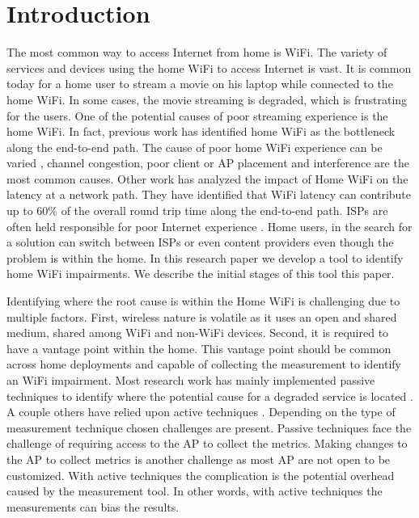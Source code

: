 \section{Introduction}\label{Introduction}

The most common way to access Internet from home is WiFi. The variety of services and devices using the home WiFi to access Internet is vast. It is common today for a home user to stream a movie on his laptop while connected to the home WiFi. In some cases, the movie streaming is degraded, which is frustrating for the users. One of the potential causes of poor streaming experience is the home WiFi. In fact, previous work \cite{homeoraccesslink} has identified home WiFi as the bottleneck along the end-to-end path. The cause of poor home WiFi experience can be varied \cite{wislow}, channel congestion, poor client or AP placement and interference are the most common causes. Other work \cite{wifi_weakest_link} has analyzed the impact of Home WiFi on the latency at a network path. They have identified that WiFi latency can contribute up to 60\% of the overall round trip time along the end-to-end path. ISPs are often held responsible for poor Internet experience \cite{predicting_effect_Home_Wifi}. Home users, in the search for a solution can switch between ISPs or even content providers even though the problem is within the home. In this research paper we develop a tool to identify home WiFi impairments. We describe the initial stages of this tool this paper. 

Identifying where the root cause is within the Home WiFi is challenging due to multiple factors. First, wireless nature is volatile as it uses an open and shared medium, shared among WiFi and non-WiFi devices. Second, it is required to have a vantage point within the home. This vantage point should be common across home deployments and capable of collecting the measurement to identify an WiFi impairment. Most research work has mainly implemented passive techniques to identify where the potential cause for a degraded service is located \cite{hostview} \cite{passive_wifi_capacity_estimation}. A couple others have relied upon active techniques \cite{can_user_level_probing}. Depending on the type of measurement technique chosen challenges are present. Passive techniques face the challenge of requiring access to the AP to collect the metrics. Making changes to the AP to collect metrics is another challenge as most AP are not open to be customized. With active techniques the complication is the potential overhead caused by the measurement tool. In other words, with active techniques the measurements can bias the results. 

